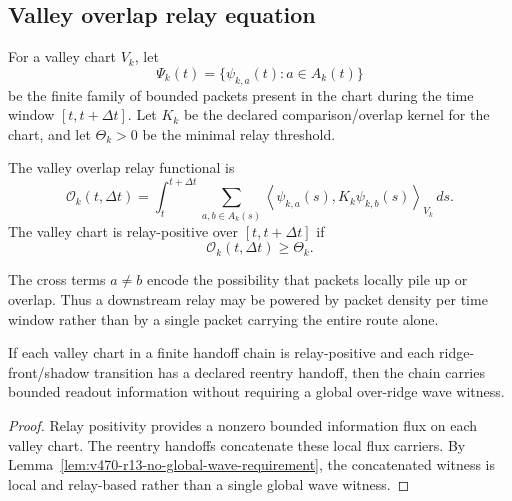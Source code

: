 \subsection{Valley overlap relay equation}
\label{subsec:v470-r13-valley-overlap-relay-equation}

\begin{definition}
\label{def:v470-r13-valley-packet-family}
For a valley chart \(V_k\), let
\[
\Psi_k(t)=\{\psi_{k,a}(t):a\in A_k(t)\}
\]
be the finite family of bounded packets present in the chart during the time
window \([t,t+\Delta t]\).  Let \(K_k\) be the declared comparison/overlap
kernel for the chart, and let \(\Theta_k>0\) be the minimal relay threshold.
\end{definition}

\begin{definition}
\label{def:v470-r13-valley-overlap-relay-functional}
The valley overlap relay functional is
\[
\mathcal O_k(t,\Delta t)
=
\int_t^{t+\Delta t}
\sum_{a,b\in A_k(s)}
\left\langle \psi_{k,a}(s),K_k\psi_{k,b}(s)\right\rangle_{V_k}\,ds.
\]
The valley chart is relay-positive over \([t,t+\Delta t]\) if
\[
\mathcal O_k(t,\Delta t)\ge \Theta_k.
\]
\end{definition}

\begin{remark}
The cross terms \(a\ne b\) encode the possibility that packets locally pile up
or overlap.  Thus a downstream relay may be powered by packet density per time
window rather than by a single packet carrying the entire route alone.
\end{remark}

\begin{proposition}
\label{prop:v470-r13-overlap-relay-weakens-ridge-obstruction}
If each valley chart in a finite handoff chain is relay-positive and each
ridge-front/shadow transition has a declared reentry handoff, then the chain
carries bounded readout information without requiring a global over-ridge wave
witness.
\end{proposition}

\begin{proof}
Relay positivity provides a nonzero bounded information flux on each valley
chart.  The reentry handoffs concatenate these local flux carriers.  By
Lemma~\ref{lem:v470-r13-no-global-wave-requirement}, the concatenated witness is
local and relay-based rather than a single global wave witness.
\end{proof}

